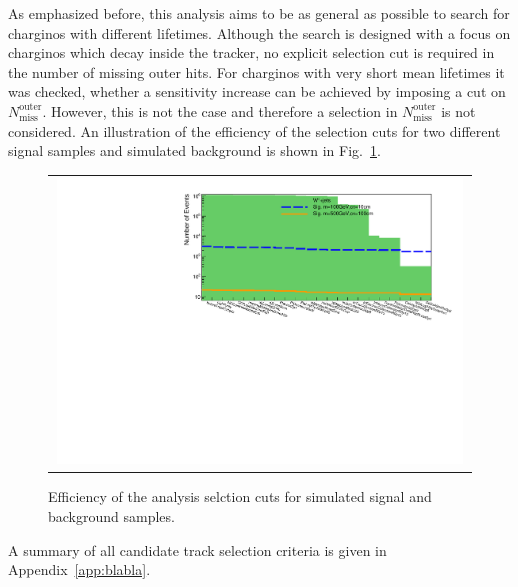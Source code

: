 As emphasized before, this analysis aims to be as general as possible to search for charginos with different lifetimes.
Although the search is designed with a focus on charginos which decay inside the tracker, no explicit selection cut is required in the number of missing outer hits.
For charginos with very short mean lifetimes it was checked, whether a sensitivity increase can be achieved by imposing a cut on $N_{\text{miss}}^{\text{outer}}$.
However, this is not the case and therefore a selection in $N_{\text{miss}}^{\text{outer}}$ is not considered.
An illustration of the efficiency of the selection cuts for two different signal samples and simulated background is shown in Fig.~\ref{fig:CutFlow}.
\begin{figure}[!t]
  \centering 
  \begin{tabular}{c}
    \includegraphics[width=0.99\textwidth]{figures/analysis/countsTrackCriteria_log.pdf}
  \end{tabular}
  \caption{Efficiency of the analysis selction cuts for simulated signal and background samples.}
  \label{fig:CutFlow}
\end{figure}
A summary of all candidate track selection criteria is given in Appendix~\ref{app:blabla}.\\


